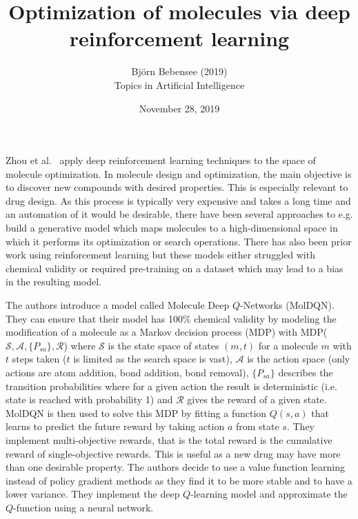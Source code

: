 \documentclass[12pt]{article}
\begin{document}
 
 
\title{Optimization of molecules via deep reinforcement learning}
\author{Bj\"orn Bebensee (2019)\\ %
Topics in Artificial Intelligence}
\date{November 28, 2019}
\maketitle

\noindent
Zhou et al.~\cite{zhou} apply deep reinforcement learning techniques to the space of molecule optimization. In molecule design and optimization, the main objective is to discover new compounds with desired properties. This is especially relevant to drug design. As this process is typically very expensive and takes a long time and an automation of it would be desirable, there have been several approaches to e.g. build a generative model which maps molecules to a high-dimensional space in which it performs its optimization or search operations. There has also been prior work using reinforcement learning but these models either struggled with chemical validity or required pre-training on a dataset which may lead to a bias in the resulting model.

The authors introduce a model called Molecule Deep $Q$-Networks (MolDQN). They can ensure that their model has 100\% chemical validity by modeling the modification of a molecule as a Markov decision process (MDP) with MDP($\mathcal{S}, \mathcal{A}, \{P_{sa}\},\mathcal{R}$) where $\mathcal{S}$ is the state space of states $(m,t)$ for a molecule $m$ with $t$ steps taken ($t$ is limited as the search space is vast), $\mathcal{A}$ is the action space (only actions are atom addition, bond addition, bond removal), $\{P_{sa}\}$ describes the transition probabilities where for a given action the result is deterministic (i.e. state is reached with probability 1) and $\mathcal{R}$ gives the reward of a given state. MolDQN is then used to solve this MDP by fitting a function $Q(s,a)$ that learns to predict the future reward by taking action $a$ from state $s$. They implement multi-objective rewards, that is the total reward is the cumulative reward of single-objective rewards. This is useful as a new drug may have more than one desirable property. The authors decide to use a value function learning instead of policy gradient methods as they find it to be more stable and to have a lower variance. They implement the deep $Q$-learning model and approximate the $Q$-function using a neural network.
\end{document}
